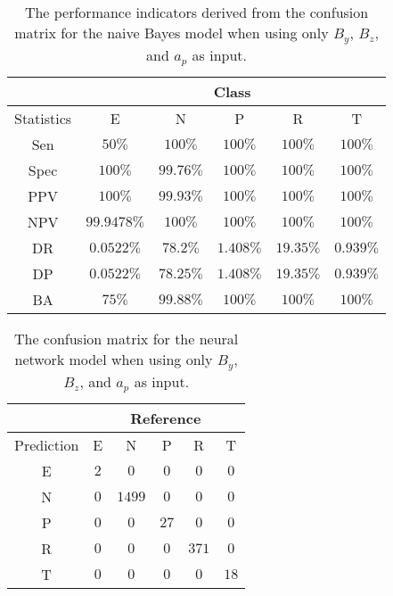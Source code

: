 \begin{table}[!ht]
	\centering
	\begin{tabular}{|c|c|c|c|c|c|}
		\hline
		 & \multicolumn{5}{c|}{Class} \\ \hline
		Statistics & E & N & P & R & T \\ \hline
		Sen & $50\%$ & $100\%$ & $100\%$ & $100\%$ & $100\%$ \\ \hline
		Spec & $100\%$ & $99.76\%$ & $100\%$ & $100\%$ & $100\%$ \\ \hline
		PPV & $100\%$ & $99.93\%$ & $100\%$ & $100\%$ & $100\%$ \\ \hline
		NPV & $99.9478\%$ & $100\%$ & $100\%$ & $100\%$ & $100\%$ \\ \hline
		DR & $0.0522\%$ & $78.2\%$ & $1.408\%$ & $19.35\%$ & $0.939\%$ \\ \hline
		DP & $0.0522\%$ & $78.25\%$ & $1.408\%$ & $19.35\%$ & $0.939\%$ \\ \hline
		BA & $75\%$ & $99.88\%$ & $100\%$ & $100\%$ & $100\%$ \\ \hline
	\end{tabular}
	\caption{The performance indicators derived from the confusion matrix for the naive Bayes model when using only $B_{y}$, $B_{z}$, and $a_{p}$ as input.}
	\label{tab:cs:reverse:yzap:nb}
\end{table}

\begin{table}[!ht]
	\centering
	\begin{tabular}{|c|c|c|c|c|c|}
		\hline
		 & \multicolumn{5}{|c|}{Reference} \\ \hline
		 Prediction & E & N & P & R & T \\ \hline
		 E & $2$ & $0$ & $0$ & $0$ & $0$ \\ \hline
		 N & $0$ & $1499$ & $0$ & $0$ & $0$ \\ \hline
		 P & $0$ & $0$ & $27$ & $0$ & $0$ \\ \hline
		 R & $0$ & $0$ & $0$ & $371$ & $0$ \\ \hline
		 T & $0$ & $0$ & $0$ & $0$ & $18$ \\ \hline
	\end{tabular}
	\caption{The confusion matrix for the neural network model when using only $B_{y}$, $B_{z}$, and $a_{p}$ as input.}
	\label{tab:cm:yzap:nnet}
\end{table}

